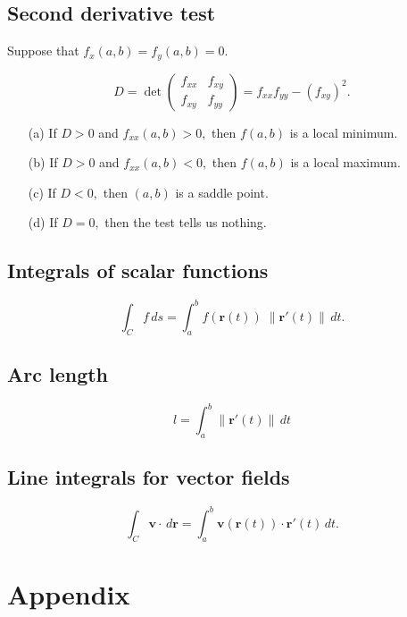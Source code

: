 \documentclass[12pt, a4paper]{article}
\newcommand{\mb}[1]{\mathbf{#1}}
\theoremstyle{definition}
\theoremstyle{plain}
\begin{document}
\subsection{Second derivative test}

Suppose that $f_x(a,b)=f_y(a,b)=0.$

$$D=\det\begin{pmatrix} f_{xx} & f_{xy} \\ f_{xy} & f_{yy} \end{pmatrix} = f_{xx}f_{yy}-(f_{xy})^2.$$

\begin{enumerate}
	
	\item[(a)] If $D > 0$ and $f_{xx}(a,b)>0,$ then $f(a,b)$ is a local minimum.

	\item[(b)] If $D>0$ and $f_{xx}(a,b)<0,$ then $f(a,b)$ is a local maximum.

	\item[(c)] If $D<0,$ then $(a,b)$ is a saddle point.

	\item[(d)] If $D=0,$ then the test tells us nothing.

\end{enumerate}

\subsection{Integrals of scalar functions}

$$\int_C f \, ds=\int_{a}^{b}f(\mb{r}(t)) \; \|\mb{r'}(t)\|\,dt.$$

\subsection{Arc length}

$$l=\int_a^b \|\mb{r'}(t)\| \, dt$$

\subsection{Line integrals for vector fields}

$$\int_C \mb{v}\cdot \,d\mb{r}=\int_{a}^{b} \mb{v}(\mb{r}(t))\cdot\mb{r'}(t)\,dt.$$

\section{Appendix}
\end{document}
